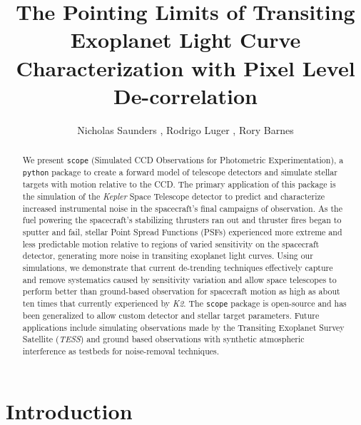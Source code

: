 \documentclass[12pt,preprint]{aastex}
\begin{document}

\title{The Pointing Limits of Transiting Exoplanet Light Curve Characterization with Pixel Level De-correlation}

\author{Nicholas Saunders , Rodrigo Luger , Rory Barnes }


\begin{abstract}

	We present \texttt{scope} (Simulated CCD Observations for Photometric Experimentation), a \texttt{python} package to create a forward model of telescope detectors and simulate stellar targets with motion relative to the CCD. The primary application of this package is the simulation of the \textit{Kepler} Space Telescope detector to predict and characterize increased instrumental noise in the spacecraft's final campaigns of observation. As the fuel powering the spacecraft's stabilizing thrusters ran out and thruster fires began to sputter and fail, stellar Point Spread Functions (PSFs) experienced more extreme and less predictable motion relative to regions of varied sensitivity on the spacecraft detector, generating more noise in transiting exoplanet light curves. Using our simulations, we demonstrate that current de-trending techniques effectively capture and remove systematics caused by sensitivity variation and allow space telescopes to perform better than ground-based observation for spacecraft motion as high as about ten times that currently experienced by \textit{K2}. The \texttt{scope} package is open-source and has been generalized to allow custom detector and stellar target parameters. Future applications include simulating observations made by the Transiting Exoplanet Survey Satellite (\textit{TESS}) and ground based observations with synthetic atmospheric interference as testbeds for noise-removal techniques.

\end{abstract}

\section{Introduction}
\label{sec:intro}
\end{document}

